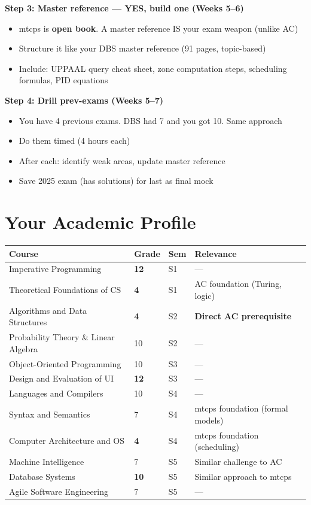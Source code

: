 \documentclass[11pt,a4paper]{article}
\begin{document}
\textbf{Step 3: Master reference --- YES, build one (Weeks 5--6)}
\begin{itemize}[nosep]
\item mtcps is \textbf{open book}. A master reference IS your exam weapon (unlike AC)
\item Structure it like your DBS master reference (91 pages, topic-based)
\item Include: UPPAAL query cheat sheet, zone computation steps, scheduling formulas, PID equations
\end{itemize}

\textbf{Step 4: Drill prev-exams (Weeks 5--7)}
\begin{itemize}[nosep]
\item You have 4 previous exams. DBS had 7 and you got 10. Same approach
\item Do them timed (4 hours each)
\item After each: identify weak areas, update master reference
\item Save 2025 exam (has solutions) for last as final mock
\end{itemize}

\section{Your Academic Profile}

\begin{center}
\renewcommand{\arraystretch}{1.3}
\begin{tabular}{llll}
\toprule
\textbf{Course} & \textbf{Grade} & \textbf{Sem} & \textbf{Relevance} \\
\midrule
Imperative Programming & \textcolor{successgreen}{\textbf{12}} & S1 & --- \\
Theoretical Foundations of CS & \textcolor{warnred}{\textbf{4}} & S1 & AC foundation (Turing, logic) \\
Algorithms and Data Structures & \textcolor{warnred}{\textbf{4}} & S2 & \textbf{Direct AC prerequisite} \\
Probability Theory \& Linear Algebra & 10 & S2 & --- \\
Object-Oriented Programming & 10 & S3 & --- \\
Design and Evaluation of UI & \textcolor{successgreen}{\textbf{12}} & S3 & --- \\
Languages and Compilers & 10 & S4 & --- \\
Syntax and Semantics & 7 & S4 & mtcps foundation (formal models) \\
Computer Architecture and OS & \textcolor{warnred}{\textbf{4}} & S4 & mtcps foundation (scheduling) \\
Machine Intelligence & 7 & S5 & Similar challenge to AC \\
Database Systems & \textcolor{successgreen}{\textbf{10}} & S5 & Similar approach to mtcps \\
Agile Software Engineering & 7 & S5 & --- \\
\bottomrule
\end{tabular}
\end{center}
\end{document}
